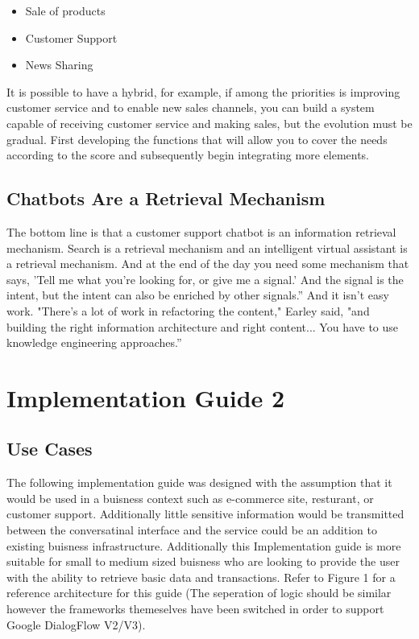 \documentclass[9pt,software]{livecoms}
\begin{document}
\begin{itemize}
\item Sale of products
\item Customer Support
\item News Sharing
\end{itemize}

It is possible to have a hybrid, for example, if among the priorities is improving customer service and to enable new sales channels, you can build a system capable of receiving customer service and making sales, but the evolution must be gradual. First developing the functions that will allow you to cover the needs according to the score and subsequently begin integrating more elements. 

\subsection{Chatbots Are a Retrieval Mechanism}
The bottom line is that a customer support chatbot is an information retrieval mechanism. Search is a retrieval mechanism and an intelligent virtual assistant is a retrieval mechanism. And at the end of the day you need some mechanism that says, 'Tell me what you're looking for, or give me a signal.' And the signal is the intent, but the intent can also be enriched by other signals.” And it isn’t easy work. "There's a lot of work in refactoring the content," Earley said, "and building the right information architecture and right content... You have to use knowledge engineering approaches.”


\section{Implementation Guide 2}

\subsection{Use Cases}
The following implementation guide was designed with the assumption that it would be used in a buisness context such as 
e-commerce site, resturant, or customer support. Additionally little sensitive information would be transmitted between the 
conversatinal interface and the service could be an addition to existing buisness infrastructure. Additionally this 
Implementation guide is more suitable for small to medium sized buisness who are looking to provide the user with 
the ability to retrieve basic data and transactions. Refer to Figure 1 for a reference architecture for this guide (The seperation of logic
should be similar however the frameworks themeselves have been switched in order to support Google DialogFlow V2/V3).
\end{document}

